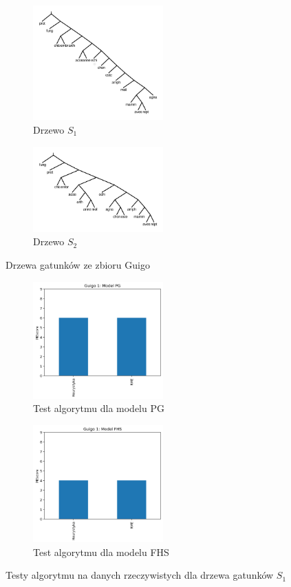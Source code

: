 \documentclass[licencjacka]{pracamgr}
\begin{document}
\begin{figure}[H]
\centering
\begin{subfigure}{.5\textwidth}
  \centering
  \includegraphics[width=50mm]{./pictures/guigo_spec_1.png}
  \caption{Drzewo $S_1$}
\end{subfigure}%
\begin{subfigure}{.5\textwidth}
  \centering
  \includegraphics[width=50mm]{./pictures/guigo_spec_2.png}
  \caption{Drzewo $S_2$}
\end{subfigure}%
\caption{Drzewa gatunków ze zbioru Guigo}
\end{figure}

\begin{figure}[H]
\centering
\begin{subfigure}{.5\textwidth}
  \centering
  \includegraphics[width=50mm]{./pictures/G1_PG.png}
  \caption{Test algorytmu dla modelu PG}
\end{subfigure}%
\begin{subfigure}{.5\textwidth}
  \centering
  \includegraphics[width=50mm]{./pictures/G1_FHS.png}
  \caption{Test algorytmu dla modelu FHS}
\end{subfigure}%
\caption{Testy algorytmu na danych rzeczywistych dla drzewa gatunków $S_1$}
\end{figure}
\end{document}
